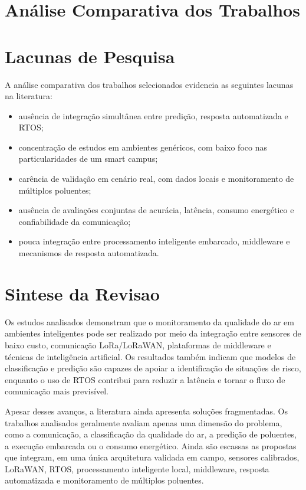 \documentclass[12pt,a4paper]{article}
\begin{document}
\section{Análise Comparativa dos Trabalhos}




\section{Lacunas de Pesquisa}
A análise comparativa dos trabalhos selecionados evidencia as seguintes lacunas
na literatura:
\begin{itemize}
  \item ausência de integração simultânea entre predição, resposta automatizada e RTOS;
  \item concentração de estudos em ambientes genéricos, com baixo foco nas
  particularidades de um smart campus;
  \item carência de validação em cenário real, com dados locais e monitoramento
  de múltiplos poluentes;
  \item ausência de avaliações conjuntas de acurácia, latência, consumo energético
  e confiabilidade da comunicação;
  \item pouca integração entre processamento inteligente embarcado, middleware
  e mecanismos de resposta automatizada.
\end{itemize}

\section{Sintese da Revisao}
Os estudos analisados demonstram que o monitoramento da qualidade do ar em
ambientes inteligentes pode ser realizado por meio da integração entre sensores
de baixo custo, comunicação LoRa/LoRaWAN, plataformas de middleware e técnicas
de inteligência artificial. Os resultados também indicam que modelos de
classificação e predição são capazes de apoiar a identificação de situações de
risco, enquanto o uso de RTOS contribui para reduzir a latência e tornar o fluxo
de comunicação mais previsível.

Apesar desses avanços, a literatura ainda apresenta soluções fragmentadas. Os
trabalhos analisados geralmente avaliam apenas uma dimensão do problema, como a
comunicação, a classificação da qualidade do ar, a predição de poluentes, a
execução embarcada ou o consumo energético. Ainda são escassas as propostas que
integram, em uma única arquitetura validada em campo, sensores calibrados,
LoRaWAN, RTOS, processamento inteligente local, middleware, resposta
automatizada e monitoramento de múltiplos poluentes.
\end{document}
